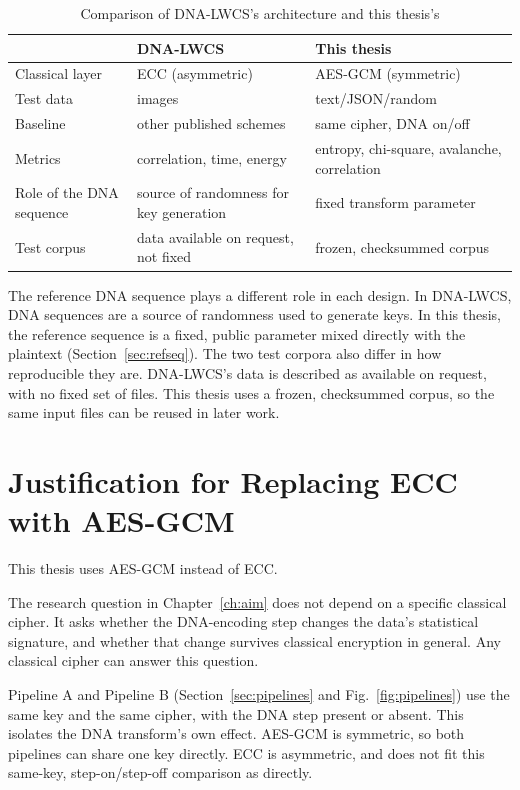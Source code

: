 \documentclass[12pt,a4paper,twoside]{report}
\numberwithin{equation}{chapter}
\begin{document}
\begin{table}[h]
\centering
\caption{Comparison of DNA-LWCS's architecture and this thesis's}
\label{tab:comparison}
\begin{tabular}{>{\raggedright\arraybackslash}p{3.2cm} >{\raggedright\arraybackslash}p{5.3cm} >{\raggedright\arraybackslash}p{5.3cm}}
\toprule
 & DNA-LWCS & This thesis \\
\midrule
Classical layer & ECC (asymmetric) & AES-GCM (symmetric) \\
Test data & 3 images & text/JSON/random \\
Baseline & other published schemes & same cipher, DNA on/off \\
Metrics & correlation, time, energy & entropy, chi-square, avalanche, correlation \\
Role of the DNA sequence & source of randomness for key generation & fixed transform parameter \\
Test corpus & data available on request, not fixed & frozen, checksummed corpus \\
\bottomrule
\end{tabular}
\end{table}

The reference DNA sequence plays a different role in each design. In
DNA-LWCS, DNA sequences are a source of randomness used to generate
keys. In this thesis, the reference sequence is a fixed, public
parameter mixed directly with the plaintext (Section~\ref{sec:refseq}).
The two test corpora also differ in how reproducible they are.
DNA-LWCS's data is described as available on request, with no fixed set
of files. This thesis uses a frozen, checksummed corpus, so the same
input files can be reused in later work.

\section{Justification for Replacing ECC with AES-GCM}
\label{sec:ecc-justification}
This thesis uses AES-GCM instead of ECC. 

The research question in Chapter~\ref{ch:aim} does not depend on a
specific classical cipher. It asks whether the DNA-encoding step
changes the data's statistical signature, and whether that change
survives classical encryption in general. Any classical cipher can
answer this question.

Pipeline A and
Pipeline B (Section~\ref{sec:pipelines} and
Fig.~\ref{fig:pipelines}) use the same key and the same cipher, with the
DNA step present or absent. This isolates the DNA transform's own
effect. AES-GCM is symmetric, so both pipelines can share one key
directly. ECC is asymmetric, and does not fit this same-key,
step-on/step-off comparison as directly.
\end{document}
